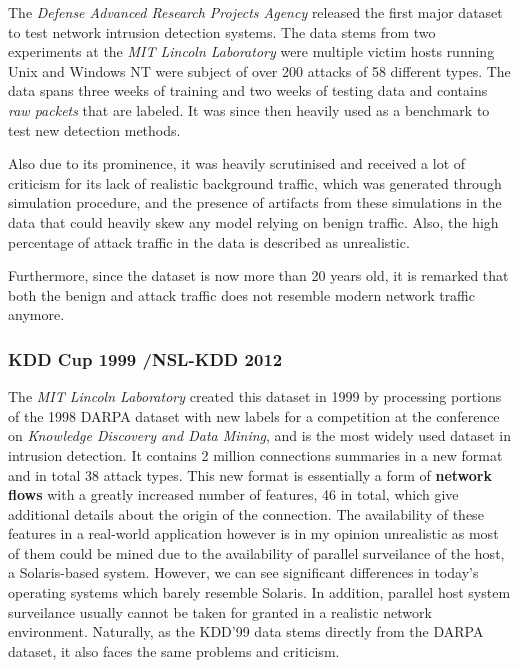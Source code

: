 \documentclass[a4paper,12pt,twoside]{report}
\begin{document}
The \textit{Defense Advanced Research Projects Agency} released the first major dataset to test network intrusion detection systems. The data stems from two experiments at the \textit{MIT Lincoln Laboratory} were multiple victim hosts running Unix and Windows NT were subject of over 200 attacks of 58 different types. The data spans three weeks of training and two weeks of testing data and contains \textit{raw packets} that are labeled. It was since then heavily used as a benchmark to test new detection methods. %

Also due to its prominence, it was heavily scrutinised and received a lot of criticism for its lack of realistic background traffic, which was generated through simulation procedure, and the presence of artifacts from these simulations in the data that could heavily skew any model relying on benign traffic. Also, the high percentage of attack traffic in the data is described as unrealistic.

Furthermore, since the dataset is now more than 20 years old, it is remarked that both the benign and attack traffic does not resemble modern network traffic anymore. 

\subsubsection*{KDD Cup 1999 \cite{cup1999data,cup1999dataset}/NSL-KDD 2012 \cite{tavallaee2012nsl}}

The \textit{MIT Lincoln Laboratory} created this dataset in 1999 by processing portions of the 1998 DARPA dataset with new labels for a competition at the conference on \textit{Knowledge Discovery and Data Mining}, and is the most widely used dataset in intrusion detection. It contains 2 million connections summaries in a new format and in total 38 attack types. This new format is essentially a form of \textbf{network flows} with a greatly increased number of features, 46 in total, which give additional details about the origin of the connection. The availability of these features in a real-world application however is in my opinion unrealistic as most of them could be mined due to the availability of parallel surveilance of the host, a Solaris-based system. However, we can see significant differences in today's operating systems which barely resemble Solaris. In addition, parallel host system surveilance usually cannot be taken for granted in a realistic network environment. Naturally, as the KDD'99 data stems directly from the DARPA dataset, it also faces the same problems and criticism. 
\end{document}
